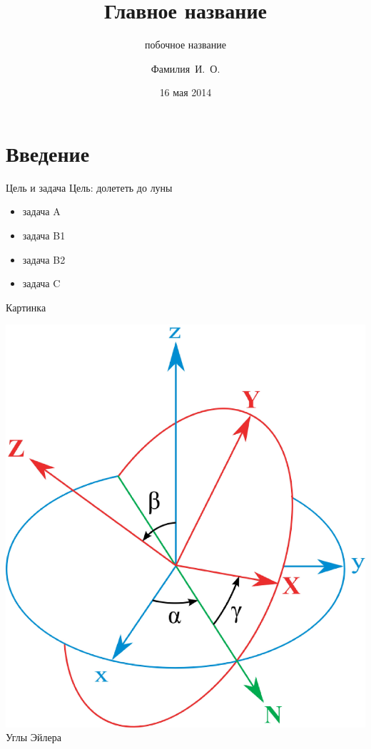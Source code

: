 \documentclass[xetex,12pt,compress,hyperref={xetex}]{beamer}
\author{Фамилия~И.~О.}
\title{Главное название}
\subtitle{побочное название}
\date{16 мая 2014}
\begin{document}
 \begin{frame}
  \titlepage
 \end{frame}
 
 \section{Введение}
 
 \begin{frame}{Цель и задача}
  Цель: долететь до луны
  \begin{itemize}
    \item задача A
    \item задача B1
    \item задача B2
    \item задача C
  \end{itemize}
 \end{frame}
 
 \begin{frame}{Картинка} 
   \begin{center}
    \includegraphics[scale=0.2]{Eulerangles.eps}  \\
    \figurename{ Углы Эйлера}
   \end{center}   
 \end{frame}
 
\end{document}
